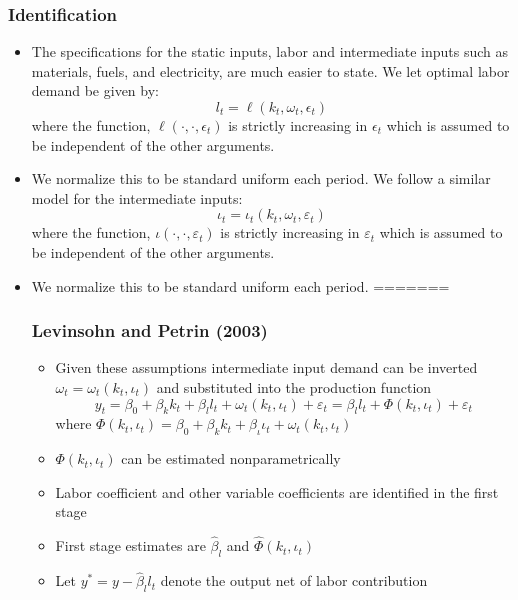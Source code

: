 \documentclass{beamer}
\begin{document}
\begin{frame}
\frametitle{Identification}
\begin{itemize}
\item The specifications for the static inputs, labor and intermediate inputs such as materials, fuels, and electricity, are much easier to state. We let optimal labor demand be given by:
\begin{equation} \label{labordemand}
l_{t}=\ell(k_{t}, \omega_{t}, \epsilon_{t})
\end{equation}
where the function, $\ell(\cdot, \cdot, \epsilon_{t})$ is strictly increasing in $\epsilon_{t}$ which is assumed to be independent of the other arguments. 
\item We normalize this to be standard uniform each period. We follow a similar model for the intermediate inputs:
\begin{equation} \label{intdemand}
\iota_{t}=\iota_{t}(k_{t}, \omega_{t}, \varepsilon_{t})
\end{equation}
where the function, $\iota(\cdot, \cdot, \varepsilon_{t})$ is strictly increasing in $\varepsilon_{t}$ which is assumed to be independent of the other arguments. 
\item We normalize this to be standard uniform each period.
=======

\begin{frame}
\frametitle{Levinsohn and Petrin (2003)}
\begin{itemize}
	\item Given these assumptions intermediate input demand can be inverted $\omega_{t}=\omega_{t}(k_{t}, \iota_{t})$ and substituted into the production function
	\begin{equation}
		y_{t}=\beta_{0}+\beta_{k}k_{t}+\beta_{l}l_{t}+\omega_{t}(k_{t}, \iota_{t})+\varepsilon_{t}=\beta_{l}l_{t}+\Phi(k_{t}, \iota_{t})+\varepsilon_{t}
	\end{equation}
	where $\Phi(k_{t}, \iota_{t})=\beta_{0}+\beta_{k}k_{t}+\beta_{\iota}\iota_{t}+\omega_{t}(k_{t}, \iota_{t})$
	
	\item $\Phi(k_{t}, \iota_{t})$ can be estimated nonparametrically
	\item Labor coefficient and other variable coefficients are identified in the first stage
	\item First stage estimates are $\hat{\beta}_{l}$ and $\hat{\Phi}(k_{t}, \iota_{t})$ 
	\item Let $y^{*}=y-\hat{\beta}_{l}l_{t}$ denote the output net of labor contribution
\end{itemize}
\end{frame}


\end{itemize}
\end{frame}
\end{document}
